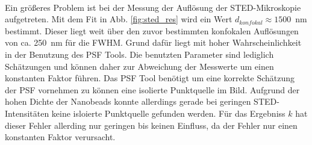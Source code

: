\\
Ein größeres Problem ist bei der Messung der Auflösung der STED-Mikroskopie aufgetreten. Mit dem Fit in Abb. \ref{fig:sted_res} wird ein Wert $d_{konfokal} \approx 1500$~nm bestimmt.
Dieser liegt weit über den zuvor bestimmten konfokalen Auflösungen von ca. 250~nm für die FWHM.
Grund dafür liegt mit hoher Wahrscheinlichkeit in der Benutzung des PSF Tools.
Die benutzten Parameter sind lediglich Schätzungen und können daher zur Abweichung der Messwerte um einen konstanten Faktor führen.
Das PSF Tool benötigt um eine korrekte Schätzung der PSF vornehmen zu können eine isolierte Punktquelle im Bild.
Aufgrund der hohen Dichte der Nanobeads konnte allerdings gerade bei geringen STED-Intensitäten keine isloierte Punktquelle gefunden werden. 
Für das Ergebniss $k$ hat dieser Fehler allerding nur geringen bis keinen Einfluss, da der Fehler nur einen konstanten Faktor verursacht.


